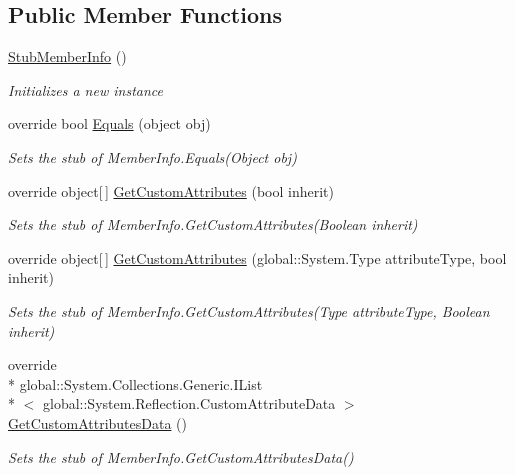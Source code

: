 \subsection*{Public Member Functions}
\begin{DoxyCompactItemize}
\item 
\hyperlink{class_system_1_1_reflection_1_1_fakes_1_1_stub_member_info_a5775014d0f9a49dff914a6894a4a35f0}{Stub\-Member\-Info} ()
\begin{DoxyCompactList}\small\item\em Initializes a new instance\end{DoxyCompactList}\item 
override bool \hyperlink{class_system_1_1_reflection_1_1_fakes_1_1_stub_member_info_a42e4546b23e05413fa54cbce762f2b9c}{Equals} (object obj)
\begin{DoxyCompactList}\small\item\em Sets the stub of Member\-Info.\-Equals(\-Object obj)\end{DoxyCompactList}\item 
override object\mbox{[}$\,$\mbox{]} \hyperlink{class_system_1_1_reflection_1_1_fakes_1_1_stub_member_info_ad98adefd6a43d740eeb54a379ea4f1de}{Get\-Custom\-Attributes} (bool inherit)
\begin{DoxyCompactList}\small\item\em Sets the stub of Member\-Info.\-Get\-Custom\-Attributes(\-Boolean inherit)\end{DoxyCompactList}\item 
override object\mbox{[}$\,$\mbox{]} \hyperlink{class_system_1_1_reflection_1_1_fakes_1_1_stub_member_info_ae7e40cfe2c4dc8e99fbb90287406fff2}{Get\-Custom\-Attributes} (global\-::\-System.\-Type attribute\-Type, bool inherit)
\begin{DoxyCompactList}\small\item\em Sets the stub of Member\-Info.\-Get\-Custom\-Attributes(\-Type attribute\-Type, Boolean inherit)\end{DoxyCompactList}\item 
override \\*
global\-::\-System.\-Collections.\-Generic.\-I\-List\\*
$<$ global\-::\-System.\-Reflection.\-Custom\-Attribute\-Data $>$ \hyperlink{class_system_1_1_reflection_1_1_fakes_1_1_stub_member_info_a8fce11f35d750fe821aceea3b864e312}{Get\-Custom\-Attributes\-Data} ()
\begin{DoxyCompactList}\small\item\em Sets the stub of Member\-Info.\-Get\-Custom\-Attributes\-Data()\end{DoxyCompactList}\item 

\end{DoxyCompactItemize}
